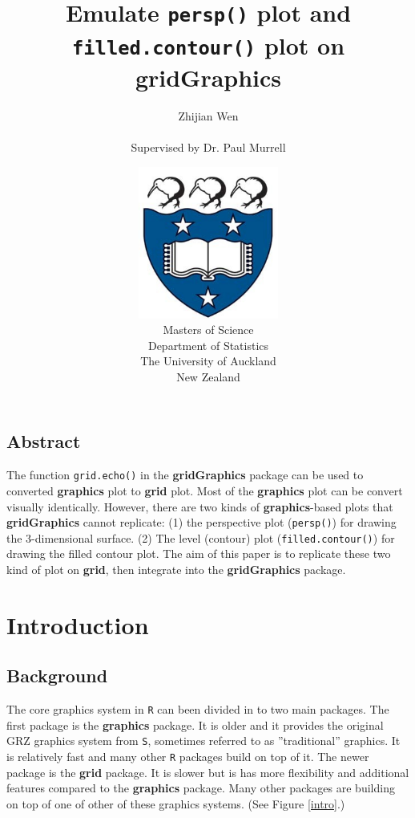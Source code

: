 \documentclass{report}
\title{\huge{Emulate \texttt{persp()} plot and \texttt{filled.contour()} plot on \textbf{gridGraphics}}}
\author{\Large{Zhijian Wen} \\ \\ \Large{Supervised by Dr. Paul Murrell}}
\date
{
\vspace{3cm}
\includegraphics[height = 5cm, width = 5cm]{logo.jpg}\\
\vspace{1cm}
Masters of Science\\
Department of Statistics\\
The University of Auckland\\
New Zealand
}
\begin{document}

\setlength{\parindent}{1pt}
\noindent

\maketitle
\tableofcontents
\listoffigures

\newpage
\section*{Abstract}
The function \texttt{grid.echo()} in the \textbf{gridGraphics} package can be used to converted \textbf{graphics} plot to \textbf{grid} plot. Most of the \textbf{graphics} plot can be convert visually identically. However, there are two kinds of \textbf{graphics}-based plots that \textbf{gridGraphics} cannot replicate: (1) the perspective plot (\texttt{persp()}) for drawing the 3-dimensional surface. (2) The level (contour) plot (\texttt{filled.contour()}) for drawing the filled contour plot. The aim of this paper is to replicate these two kind of plot on \textbf{grid}, then integrate into the \textbf{gridGraphics} package.

\chapter{Introduction}
\section{Background}
The core graphics system in \texttt{R} \citep{R2017} can been divided in to two main packages. The first package is the \textbf{graphics} package. It is older and it provides the original GRZ graphics system from \texttt{S}, sometimes referred to as ''traditional'' graphics. It is relatively fast and many other \texttt{R} packages build on top of it. The newer package is the \textbf{grid} package. It is slower but is has more flexibility and additional features compared to the \textbf{graphics} package. Many other packages are building on top of one of other of these graphics systems. (See Figure \ref{intro}.) \\
\end{document}
